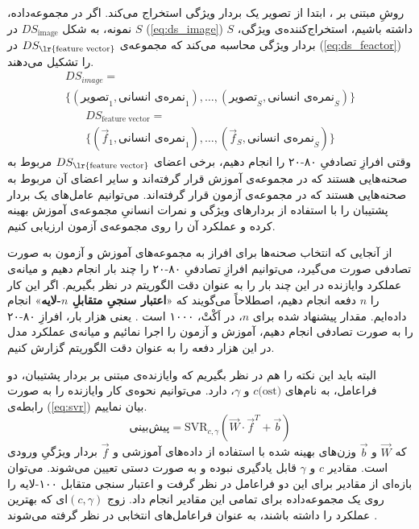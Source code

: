 \documentclass[twocolumn]{article}
\begin{document}
روشِ مبتنی بر ، ابتدا از تصویر یک بردار ویژگی استخراج می‌کند. اگر در مجموعه‌داده، $S$ نمونه، به شکل $DS_{\text{image}}$ در (\ref{eq:ds_image}) داشته باشیم، استخراج‌کننده‌ی ویژگی، $S$ بردار ویژگی محاسبه می‌کند که مجموعه‌ی $DS_{\text{\lr{feature vector}}}$ در (\ref{eq:ds_feactor}) را تشکیل می‌دهند.
\begin{equation}
	\begin{aligned}
	DS_{image}= \\ \{(\text{تصویر}_1,\text{نمره‌ی انسانی}_1), \ldots, (\text{تصویر}_S, \text{نمره‌ی انسانی}_S)\}
	\end{aligned}
	\label{eq:ds_image}
\end{equation}
\begin{equation}
	\begin{aligned}
	DS_{\text{feature vector}}=\\ \{(\vec{f}_1, \text{نمره‌ی انسانی}_1), \ldots, (\vec{f}_S, \text{نمره‌ی انسانی}_S)\}
	\end{aligned}
	\label{eq:ds_feactor}
\end{equation}
وقتی افرازِ تصادفیِ ۸۰-۲۰ را انجام دهیم، برخی اعضای $DS_{\text{\lr{feature vector}}}$ مربوط به صحنه‌هایی هستند که در مجموعه‌ی آموزش قرار گرفته‌اند و سایر اعضای آن مربوط به صحنه‌هایی هستند که در مجموعه‌ی آزمون قرار گرفته‌اند. می‌توانیم عامل‌های یک بردار پشتیبان را با استفاده از بردارهای ویژگی و نمرات انسانیِ مجموعه‌ی آموزش بهینه کرده و عملکرد آن را روی مجموعه‌ی آزمون ارزیابی کنیم. 

از آنجایی که انتخاب صحنه‌ها برای افراز به مجموعه‌های آموزش و آزمون به صورت تصادفی صورت می‌گیرد، می‌توانیم افرازِ تصادفیِ ۸۰-۲۰ را چند بار انجام دهیم و میانه‌ی عملکرد وایازنده در این چند بار را به عنوان دقت الگوریتم در نظر بگیریم. اگر این کار را $n$ دفعه انجام دهیم، اصطلاحاً می‌گویند که «\textbf{اعتبار سنجیِ متقابلِ $n$-لایه}» انجام داده‌ایم. مقدار پیشنهاد شده برای $n$، در اَکْتْ، ۱۰۰۰ است \cite{xue2014blind}. یعنی هزار بار، افرازِ ۸۰-۲۰ را به صورت تصادفی انجام دهیم، آموزش و آزمون را اجرا نمائیم و میانه‌ی عملکرد مدل در این هزار دفعه را به عنوان دقت الگوریتم گزارش کنیم.

البته باید این نکته را هم در نظر بگیریم که وایازنده‌ی مبتنی بر بردار پشتیبان، دو فراعامل، به نام‌های $c\text{(ost)}$ و $\gamma$، دارد. می‌توانیم نحوه‌ی کار وایازنده را به صورت رابطه‌ی (\ref{eq:svr}) بیان نماییم.
\begin{equation}
	\text{پیش‌بینی} = \text{SVR}_{c, \gamma}(\vec{W}\cdot \vec{f}^T+\vec{b})
	\label{eq:svr}
\end{equation}
که $\vec{W}$ و $\vec{b}$ وزن‌های بهینه شده با استفاده از داده‌های آموزشی و $\vec{f}$ بردار ویژگیِ ورودی است. مقادیر $c$ و $\gamma$ قابل یادگیری نبوده و به صورت دستی تعیین می‌شوند. می‌توان بازه‌ای از مقادیر برای این دو فراعامل در نظر گرفت و اعتبار سنجی متقابل ۱۰۰-لایه را روی یک مجموعه‌داده برای تمامی این مقادیر انجام داد. زوج $(c, \gamma)$ای که بهترین عملکرد را داشته باشند، به عنوان فراعامل‌های انتخابی در نظر گرفته می‌شوند \cite{xue2014blind}.
\end{document}
